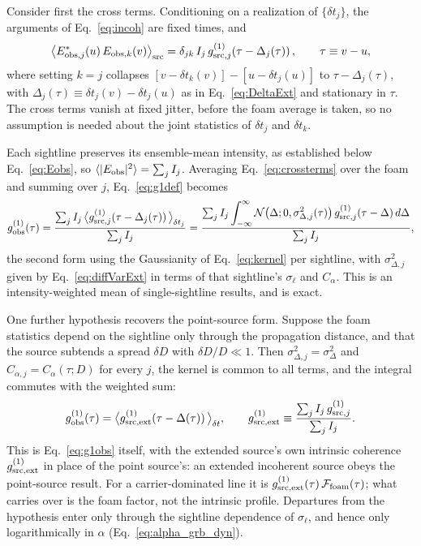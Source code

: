 \documentclass[aps,prd,onecolumn,amsmath,amssymb]{revtex4-2}
\begin{document}
Consider first the cross terms.  Conditioning on a realization of
$\{\delta t_j\}$, the arguments of
Eq.~\eqref{eq:incoh} are fixed times, and
\begin{equation}
  \big\langle E^*_{{\rm obs},j}(u)\,E_{{\rm obs},k}(v)\big\rangle_{\rm src}
    = \delta_{jk}\,I_j\,
      g^{(1)}_{{\rm src},j}\!\left(\tau-\Delta_j(\tau)\right),
  \qquad \tau\equiv v-u,
  \label{eq:crossterms}
\end{equation}
where setting $k=j$ collapses
$[v-\delta t_k(v)]-[u-\delta t_j(u)]$ to $\tau-\Delta_j(\tau)$, with
$\Delta_j(\tau)\equiv\delta t_j(v)-\delta t_j(u)$ as in
Eq.~\eqref{eq:DeltaExt} and stationary in $\tau$.  The cross terms vanish at
fixed jitter, before the foam average is taken, so no assumption is needed
about the joint statistics of $\delta t_j$ and
$\delta t_k$.

Each sightline preserves its ensemble-mean intensity, as established
below Eq.~\eqref{eq:Eobs}, so $\langle|E_{\rm obs}|^2\rangle=\sum_j I_j$.
Averaging Eq.~\eqref{eq:crossterms} over the foam and summing over $j$,
Eq.~\eqref{eq:g1def} becomes
\begin{equation}
  g^{(1)}_{\rm obs}(\tau)
    = \frac{\sum_j I_j\,\big\langle
        g^{(1)}_{{\rm src},j}\!\left(\tau-\Delta_j(\tau)\right)
      \big\rangle_{\delta t_j}}{\sum_j I_j}
    = \frac{\sum_j I_j\displaystyle\int_{-\infty}^{\infty}
        \mathcal{N}\!\left(\Delta;0,\sigma^2_{\Delta,j}(\tau)\right)
        g^{(1)}_{{\rm src},j}(\tau-\Delta)\,d\Delta}{\sum_j I_j},
  \label{eq:g1obs_ext}
\end{equation}
the second form using the Gaussianity of Eq.~\eqref{eq:kernel}
per sightline, with $\sigma^2_{\Delta,j}$ given by Eq.~\eqref{eq:diffVarExt}
in terms of that sightline's $\sigma_\ell$ and $C_\alpha$.  This is an
intensity-weighted mean of single-sightline results, and is exact.

One further hypothesis recovers the point-source form.  Suppose the
foam statistics depend on the sightline only through the propagation
distance, and that the source subtends a spread $\delta D$ with
$\delta D/D\ll1$.  Then $\sigma^2_{\Delta,j}=\sigma^2_\Delta$ and
$C_{\alpha,j}=C_\alpha(\tau;D)$ for every $j$, the kernel is common to all
terms, and the integral commutes with the weighted sum:
\begin{equation}
  g^{(1)}_{\rm obs}(\tau)
    = \big\langle g^{(1)}_{\rm src,ext}\!\left(\tau-\Delta(\tau)\right)
      \big\rangle_{\delta t},
  \qquad
  g^{(1)}_{\rm src,ext}\equiv\frac{\sum_j I_j\,g^{(1)}_{{\rm src},j}}
                                   {\sum_j I_j}.
  \label{eq:g1obs_ext_hom}
\end{equation}
This is Eq.~\eqref{eq:g1obs} itself, with the extended source's own
intrinsic coherence $g^{(1)}_{\rm src,ext}$ in place of the point source's:
an extended incoherent source obeys the point-source result.  For a
carrier-dominated line it is
$g^{(1)}_{\rm src,ext}(\tau)\,\mathcal{F}_{\rm foam}(\tau)$; what carries
over is the foam factor, not the intrinsic profile.  Departures from the
hypothesis enter only through the sightline dependence of $\sigma_\ell$, and
hence only logarithmically in $\alpha$
(Eq.~\eqref{eq:alpha_grb_dyn}).
\end{document}
